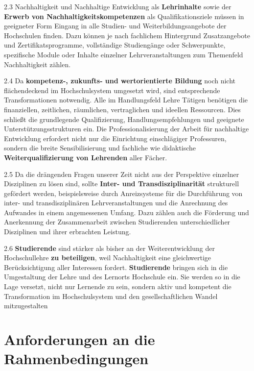 \documentclass[DIV=12]{scrartcl}
\begin{document}
2.3 Nachhaltigkeit und Nachhaltige Entwicklung als \textbf{Lehrinhalte}
sowie der \textbf{Erwerb von Nachhaltigkeitskompetenzen} als
Qualifikationsziele müssen in geeigneter Form Eingang in alle Studien-
und Weiterbildungsangebote der Hochschulen finden. Dazu können je nach
fachlichem Hintergrund Zusatzangebote und Zertifikatsprogramme,
vollständige Studiengänge oder Schwerpunkte, spezifische Module oder
Inhalte einzelner Lehrveranstaltungen zum Themenfeld Nachhaltigkeit
zählen.

2.4 Da \textbf{kompetenz-, zukunfts- und wertorientierte Bildung} noch
nicht flächendeckend im Hochschulsystem umgesetzt wird, sind
entsprechende Transformationen notwendig. Alle im Handlungsfeld Lehre
Tätigen benötigen die finanziellen, zeitlichen, räumlichen,
vertraglichen und ideellen Ressourcen. Dies schließt die grundlegende
Qualifizierung, Handlungsempfehlungen und geeignete
Unterstützungsstrukturen ein. Die Professionalisierung der Arbeit für
nachhaltige Entwicklung erfordert nicht nur die Einrichtung
einschlägiger Professuren, sondern die breite Sensibilisierung und
fachliche wie didaktische \textbf{Weiterqualifizierung von Lehrenden}
aller Fächer.

2.5 Da die drängenden Fragen unserer Zeit nicht aus der Perspektive
einzelner Disziplinen zu lösen sind, sollte \textbf{Inter- und
Transdisziplinarität} strukturell gefördert werden, beispielsweise durch
Anreizsysteme für die Durchführung von inter- und transdisziplinären
Lehrveranstaltungen und die Anrechnung des Aufwandes in einem
angemessenen Umfang. Dazu zählen auch die Förderung und Anerkennung der
Zusammenarbeit zwischen Studierenden unterschiedlicher Disziplinen und
ihrer erbrachten Leistung.

2.6 \textbf{Studierende} sind stärker als bisher an der
Weiterentwicklung der Hochschullehre \textbf{zu beteiligen}, weil
Nachhaltigkeit eine gleichwertige Berücksichtigung aller Interessen
fordert. \textbf{Studierende} bringen sich in die Umgestaltung der Lehre
und des Lernorts Hochschule ein. Sie werden so in die Lage versetzt,
nicht nur Lernende zu sein, sondern aktiv und kompetent die
Transformation im Hochschulsystem und den gesellschaftlichen Wandel
mitzugestalten

\hypertarget{anforderungen-an-die-rahmenbedingungen}{%
\section{Anforderungen an die
Rahmenbedingungen}\label{anforderungen-an-die-rahmenbedingungen}}
\end{document}
